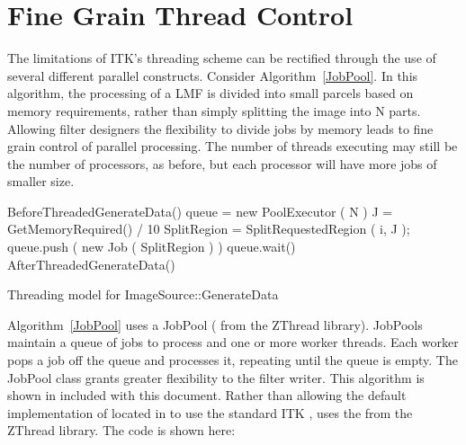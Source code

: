 \documentclass{InsightArticle}
\begin{document}
\section{Fine Grain Thread Control}
The limitations of ITK's threading scheme can be rectified through the use of several different parallel constructs.  Consider Algorithm~\ref{JobPool}.  In this algorithm, the processing of a LMF is divided into small parcels based on memory requirements, rather than simply splitting the image into N parts.  Allowing filter designers the flexibility to divide jobs by memory leads to fine grain control of parallel processing.  The number of threads executing may still be the number of processors, as before, but each processor will have more jobs of smaller size.

\begin{algorithm}
  \begin{algorithmic}
    \STATE BeforeThreadedGenerateData()
    \STATE queue = new PoolExecutor ( N ) 
    \STATE J = GetMemoryRequired() / 10 
      \STATE SplitRegion = SplitRequestedRegion ( i, J );
      \STATE queue.push ( new Job ( SplitRegion ) )
    \ENDFOR
    \STATE queue.wait() 
    \STATE AfterThreadedGenerateData() 
  \end{algorithmic}
  \label{JobPool}
  \caption{Threading model for ImageSource::GenerateData  }
\end{algorithm}

Algorithm~\ref{JobPool} uses a JobPool ( from the ZThread library).  JobPools maintain a queue of jobs to process and one or more worker threads.  Each worker pops a job off the queue and processes it, repeating until the queue is empty.  The JobPool class grants greater flexibility to the filter writer.  This algorithm is shown in  included with this document.  Rather than allowing the default implementation of  located in  to use the standard ITK ,  uses the  from the ZThread library.  The code is shown here:
\end{document}
